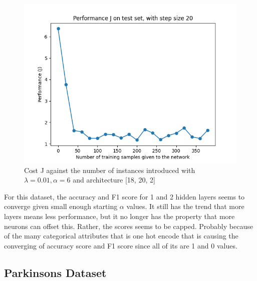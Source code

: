 \documentclass[letterpaper]{article}
\begin{document}
\begin{figure}[H]
	\includegraphics[width=\textwidth]{figures/nn_loan.csv_cost.png}
	\caption{Cost J against the number of instances introduced with $\lambda=0.01, \alpha=6$ and architecture [18, 20, 2]}
	\label{fig:nn-loan}
\end{figure}

For this dataset, the accuracy and F1 score for 1 and 2 hidden layers seems to converge given small enough starting $\alpha$ values. It still has the
trend that more layers means less performance, but it no longer has the property that more neurons can offset this. Rather, the scores seems to be
capped. Probably because of the many categorical attributes that is one hot encode that is causing the converging of accuracy score and F1 score
since all of its are 1 and 0 values.

\subsection{Parkinsons Dataset}
\end{document}
